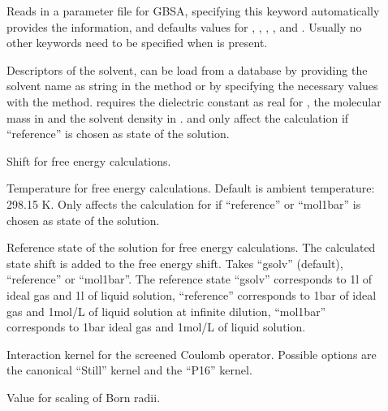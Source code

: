 \begin{description}
  \item[] Reads in a parameter file for GBSA, specifying this
    keyword automatically provides the  information, and defaults
    values for , , , 
    ,  and .
    Usually no other keywords need to be specified when  is present.

  \item[] Descriptors of the solvent, can be load from a database
    by providing the solvent name as string in the  method or
    by specifying the necessary values with the  method.
     requires the dielectric constant as real for ,
    the molecular mass in   and the
    solvent density in  .
     and  only affect the calculation if
    ``reference'' is chosen as state of the solution.

  \item[]  Shift for free energy
    calculations.

  \item[] Temperature for free energy calculations. Default is
    ambient temperature: 298.15 K.
    Only affects the calculation for if ``reference'' or ``mol1bar'' is chosen
    as state of the solution.

  \item[] 
    Reference state of the solution for free energy calculations.
    The calculated state shift is added to the free energy shift.
    Takes ``gsolv'' (default), ``reference'' or ``mol1bar''.
    The reference state ``gsolv'' corresponds to 1\;l of ideal gas and 1\;l of
    liquid  solution,
    ``reference'' corresponds to 1\;bar of ideal gas and 1\;mol/L of liquid
    solution at infinite dilution,
    ``mol1bar'' corresponds to 1\;bar ideal gas and 1\;mol/L of liquid solution.

  \item[]
    Interaction kernel for the screened Coulomb operator.
    Possible options are the canonical ``Still'' kernel\cite{still1990} and the
    ``P16'' kernel.\cite{lange2012}

  \item[] Value for scaling of Born radii.


\end{description}
